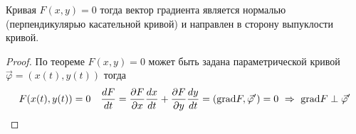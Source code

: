 \begin{block}
  Кривая $F(x, y) = 0$ тогда вектор градиента является нормалью
  (перпендикулярью касательной кривой) и направлен в сторону выпуклости кривой.
\end{block}

\begin{proof}
  По теореме $F(x,y) = 0$ может быть задана параметрической кривой
  $\vec \varphi = (x(t), y(t))$ тогда
  $$
  F(x(t), y(t)) = 0 ~~~
  \frac{dF}{dt} = \frac{\partial F}{\partial x} \frac{dx}{dt} +
  \frac{\partial F}{\partial y} \frac{dy}{dt} =
  (\mathrm{grad} F, \vec \varphi') = 0 ~ \Rightarrow ~ \mathrm{grad} F \perp \vec \varphi'
  $$
\end{proof}